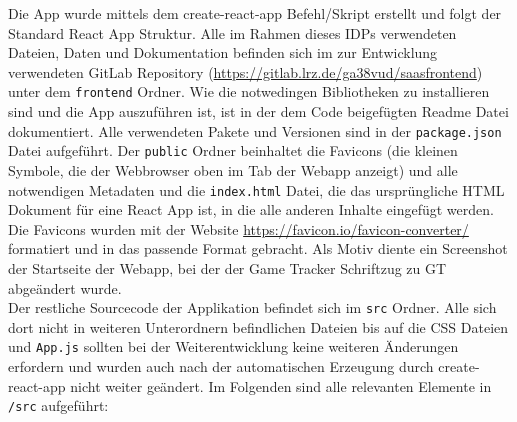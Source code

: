 Die App wurde mittels dem create-react-app Befehl/Skript erstellt und folgt der Standard React App Struktur. Alle im Rahmen dieses IDPs verwendeten Dateien, Daten und Dokumentation befinden sich im zur Entwicklung verwendeten GitLab Repository (\url{https://gitlab.lrz.de/ga38vud/saasfrontend}) unter dem \texttt{frontend} Ordner. Wie die notwedingen Bibliotheken zu installieren sind und die App auszuführen ist, ist in der dem Code beigefügten Readme Datei dokumentiert. Alle verwendeten Pakete und Versionen sind in der \texttt{package.json} Datei aufgeführt. Der \texttt{public} Ordner beinhaltet die Favicons (die kleinen Symbole, die der Webbrowser oben im Tab der Webapp anzeigt) und alle notwendigen Metadaten und die \texttt{index.html} Datei, die das ursprüngliche HTML Dokument für eine React App ist, in die alle anderen Inhalte eingefügt werden. Die Favicons wurden mit der Website \url{https://favicon.io/favicon-converter/} \cite{favicon-converter} formatiert und in das passende Format gebracht. Als Motiv diente ein Screenshot der Startseite der Webapp, bei der der Game Tracker Schriftzug zu GT abgeändert wurde.
\\
Der restliche Sourcecode der Applikation befindet sich im \texttt{src} Ordner. Alle sich dort nicht in weiteren Unterordnern befindlichen Dateien bis auf die CSS Dateien und \texttt{App.js} sollten bei der Weiterentwicklung keine weiteren Änderungen erfordern und wurden auch nach der automatischen Erzeugung durch create-react-app nicht weiter geändert. Im Folgenden sind alle relevanten Elemente in \texttt{/src} aufgeführt:


